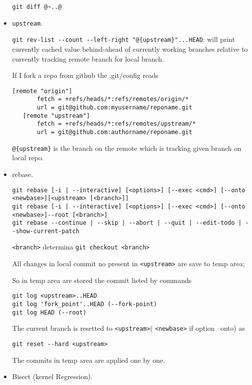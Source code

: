 \begin{itemize}
\begin{verbatim}
git diff @~..@
\end{verbatim}

\item \verb=upstream=.

\verb=git rev-list --count --left-right "@{upstream}"...HEAD=: will print currently cached value behind-ahead of currently working branches relative to currently tracking remote branch for local branch.

If I fork a repo from github the .git/config reads
\begin{verbatim}
[remote "origin"]
       fetch = +refs/heads/*:refs/remotes/origin/*
       url = git@github.com:myusername/reponame.git
   [remote "upstream"]
       fetch = +refs/heads/*:refs/remotes/upstream/*
       url = git@github.com:authorname/reponame.git
\end{verbatim}

\verb=@{upstream}= is the branch on the remote which is tracking given branch on local repo.

\item rebase.

\begin{verbatim}
git rebase [-i | --interactive] [<options>] [--exec <cmd>] [--onto <newbase>][<upstream> [<branch>]]
git rebase [-i | --interactive] [<options>] [--exec <cmd>] [--onto <newbase>]--root [<branch>]
git rebase --continue | --skip | --abort | --quit | --edit-todo | --show-current-patch
\end{verbatim}

\verb=<branch>= determina \verb=git checkout <branch>=

All changes in local commit no present in \verb=<upstream>= are save to temp area;

So in temp area are stored the commit listed by commands
\begin{verbatim}
git log <upstream>..HEAD
git log 'fork_point'..HEAD (--fork-point)
git log HEAD (--root)
\end{verbatim}

The current branch is resetted to \verb=<upstream>=( \verb=<newbase>= if option --onto) as
\begin{verbatim}
git reset --hard <upstream>
\end{verbatim}

The commits in temp area are applied one by one.

\item Bisect (kernel Regression).


\end{itemize}

